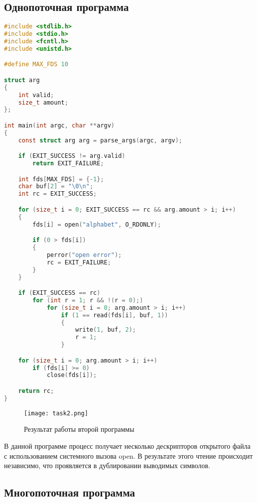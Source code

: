 
\subsection{Однопоточная программа}

\begin{lstlisting}[language=c, caption={Вторая программа (однопоточный вариант)}]
#include <stdlib.h>
#include <stdio.h>
#include <fcntl.h>
#include <unistd.h>

#define MAX_FDS 10

struct arg
{
    int valid;
    size_t amount;
};

int main(int argc, char **argv)
{
    const struct arg arg = parse_args(argc, argv);

    if (EXIT_SUCCESS != arg.valid)
        return EXIT_FAILURE;

    int fds[MAX_FDS] = {-1};
    char buf[2] = "\0\n";
    int rc = EXIT_SUCCESS;

    for (size_t i = 0; EXIT_SUCCESS == rc && arg.amount > i; i++)
    {
        fds[i] = open("alphabet", O_RDONLY);

        if (0 > fds[i])
        {
            perror("open error");
            rc = EXIT_FAILURE;
        }
    }

    if (EXIT_SUCCESS == rc)
        for (int r = 1; r && !(r = 0);)
            for (size_t i = 0; arg.amount > i; i++)
                if (1 == read(fds[i], buf, 1))
                {
                    write(1, buf, 2);
                    r = 1;
                }

    for (size_t i = 0; arg.amount > i; i++)
        if (fds[i] >= 0)
            close(fds[i]);

    return rc;
}
\end{lstlisting}

\begin{figure}[h]
    \centering
    \texttt{[image: task2.png]}
    \caption{Результат работы второй программы}
\end{figure}

В данной программе процесс получает несколько дескрипторов открытого файла
с использованием системного вызова open. В результате этого чтение происходит
независимо, что проявляется в дублировании выводимых символов.

\subsection{Многопоточная программа}

